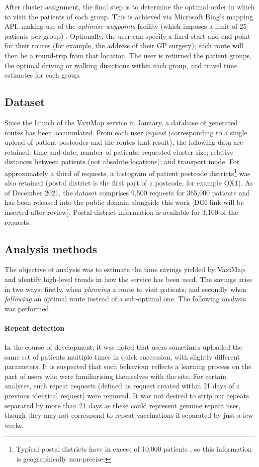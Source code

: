 \documentclass[review]{elsarticle}
\def\vm{VaxiMap}
\begin{document}
After cluster assignment, the final step is to determine the optimal order in which to visit the patients of each group. This is achieved via Microsoft Bing’s mapping API, making use of the \textit{optimise waypoints} facility (which imposes a limit of 25 patients per group) \cite{msbing}. Optionally, the user can specify a fixed start and end point for their routes (for example, the address of their GP surgery); each route will then be a round-trip from that location. The user is returned the patient groups, the optimal driving or walking directions within each group, and travel time estimates for each group. 

\subsection{Dataset}

Since the launch of the \vm{} service in January, a database of generated routes has been accumulated. From each user \textit{request} (corresponding to a single upload of patient postcodes and the routes that result), the following data are retained: time and date; number of patients; requested cluster size; relative distances between patients (not absolute locations); and transport mode. For approximately a third of requests, a histogram of patient postcode districts\footnote{Typical postal districts have in excess of 10,000 patients \cite{OfficeforNationalStatistics}, so this information is geographically non-precise.} was also retained (postal district is the first part of a postcode, for example OX1). As of December 2021, the dataset comprises 9,500 requests for 365,000 patients and has been released into the public domain alongside this work [DOI link will be inserted after review]. Postal district information is available for 3,100 of the requests. 

\subsection{Analysis methods}

The objective of analysis was to estimate the time savings yielded by \vm{} and identify high-level trends in how the service has been used. The savings arise in two ways: firstly, when \textit{planning} a route to visit patients; and secondly when \textit{following} an optimal route instead of a sub-optimal one. The following analysis was performed. 

\paragraph{Repeat detection}
In the course of development, it was noted that users sometimes uploaded the same set of patients multiple times in quick succession, with slightly different parameters. It is suspected that such behaviour reflects a learning process on the part of users who were familiarising themselves with the site. For certain analyses, such repeat requests (defined as request created within 21 days of a previous identical request) were removed. It was not desired to strip out repeats separated by more than 21 days as these could represent genuine repeat uses, though they may not correspond to repeat vaccinations if separated by just a few weeks. 
\end{document}
